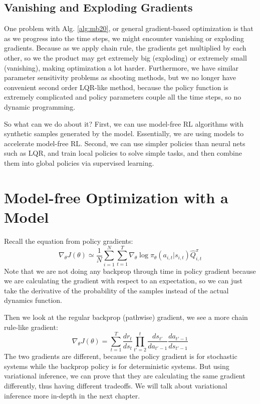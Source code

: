 \subsection{Vanishing and Exploding Gradients}
One problem with Alg. \ref{alg:mb20}, or general gradient-based optimization is that as we progress into the time steps, we might encounter vanishing or exploding gradients. Because as we apply chain rule, the gradients get multiplied by each other, so we the product may get extremely big (exploding) or extremely small (vanishing), making optimization a lot harder. Furthermore, we have similar parameter sensitivity problems as shooting methods, but we no longer have convenient second order LQR-like method, because the policy function is extremely complicated and policy parameters couple all the time steps, so no dynamic programming. %

So what can we do about it? First, we can use model-free RL algorithms with synthetic samples generated by the model. Essentially, we are using models to accelerate model-free RL. Second, we can use simpler policies than neural nets such as LQR, and train local policies to solve simple tasks, and then combine them into global policies via supervised learning. 

\section{Model-free Optimization with a Model}
Recall the equation from policy gradients:
\[
\nabla_\theta J(\theta) \simeq \frac{1}{N}\sum_{i=1}^N\sum_{t=1}^T\nabla_\theta \log\pi_\theta(a_{i,t}|s_{i,t})\hat{Q}^\pi_{i,t}
\]
Note that we are not doing any backprop through time in policy gradient because we are calculating the gradient with respect to an expectation, so we can just take the derivative of the probability of the samples instead of the actual dynamics function. 

Then we look at the regular backprop (pathwise) gradient, we see a more chain rule-like gradient:
\[
\nabla_\theta J(\theta) = \sum_{t=1}^T\frac{dr_t}{ds_t}\prod_{t'=2}^t\frac{d{s_{t'}}}{da_{t'-1}}\frac{da_{t'-1}}{ds_{t'-1}}
\]
The two gradients are different, because the policy gradient is for stochastic systems while the backprop policy is for deterministic systems. But using variational inference, we can prove that they are calculating the same gradient differently, thus having different tradeoffs. We will talk about variational inference more in-depth in the next chapter. 


